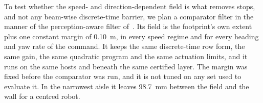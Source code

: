 To test whether the speed- and direction-dependent field is what removes stops, and not any beam-wise discrete-time barrier, we plan a comparator filter in the manner of the perception-aware filter of~\cite{olayemi2026}. Its field is the footprint's own extent plus one constant margin of 0.10~m, in every speed regime and for every heading and yaw rate of the command. It keeps the same discrete-time row form, the same gain, the same quadratic program and the same actuation limits, and it runs on the same hosts and beneath the same certified layer. The margin was fixed before the comparator was run, and it is not tuned on any set used to evaluate it. In the narrowest aisle it leaves 98.7~mm between the field and the wall for a centred robot. 

